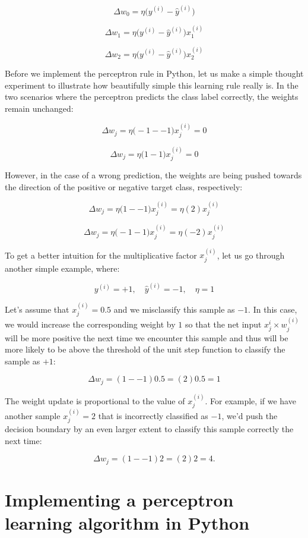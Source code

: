 \documentclass[letterpaper]{report}
\begin{document}
\[
\Delta w_0 = \eta \bigg(  y^{(i)} - \hat{y}^{(i)} \bigg) 
\]

\[
\Delta w_1 = \eta \bigg(  y^{(i)} - \hat{y}^{(i)} \bigg) x_{1}^{(i)}
\]

\[
\Delta w_2 = \eta \bigg(  y^{(i)} - \hat{y}^{(i)} \bigg) x_{2}^{(i)}
\]

Before we implement the perceptron rule in Python, let us make a simple thought experiment to illustrate how beautifully simple this learning rule really is. In the two scenarios where the perceptron predicts the class label correctly, the weights remain unchanged:

\[
\Delta w_j = \eta \bigg( -1 -- 1 \bigg)x_{j}^{(i)} = 0
\]

\[
\Delta w_j = \eta \bigg( 1-1 \bigg)x_{j}^{(i)} = 0
\]

However, in the case of a wrong prediction, the weights are being pushed towards the direction of the positive or negative target class, respectively:

\[
\Delta w_j = \eta \bigg( 1 -- 1 \bigg)x_{j}^{(i)} = \eta(2)x_{j}^{(i)}
\]

\[
\Delta w_j = \eta \bigg( -1-1 \bigg)x_{j}^{(i)} = \eta(-2)x_{j}^{(i)}
\]


To get a better intuition for the multiplicative factor $x_{j}^{(i)}$, let us go through another
simple example, where:

\[
y^{(i)} = +1, \quad \hat{y}^{(i)} = -1, \quad \eta = 1
 \]

Let's assume that $x_{j}^{(i)}=0.5$ and we misclassify this sample as $-1$. In this case, we would increase the corresponding weight by $1$ so that the net input $x_{j}^{i} \times w_{j}^{(i)}$ will be more positive the next time we encounter this sample and thus will be more likely to be above the threshold of the unit step function to classify the sample as  $+1$:

\[
\Delta w_{j} = (1--1)0.5 = (2)0.5 = 1
\]

The weight update is proportional to the value of $x_{j}^{(i)}$. For example, if we have another sample $x_{j}^{(i)}=2$ that is incorrectly classified as $-1$, we'd push the decision boundary by an even larger extent to classify this sample correctly the next time:

\[
\Delta w_{j} = (1--1)2 = (2)2 = 4.
\]


\section{Implementing a perceptron learning algorithm in Python}
\end{document}
